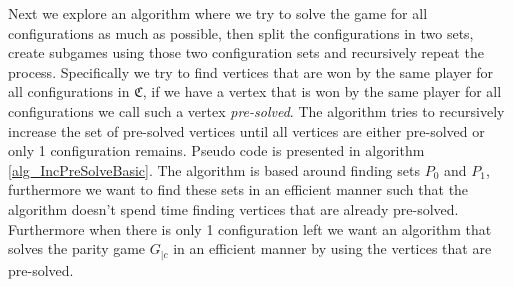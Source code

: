 Next we explore an algorithm where we try to solve the game for all configurations as much as possible, then split the configurations in two sets, create subgames using those two configuration sets and recursively repeat the process. Specifically we try to find vertices that are won by the same player for all configurations in $\mathfrak{C}$, if we have a vertex that is won by the same player for all configurations we call such a vertex \textit{pre-solved}. The algorithm tries to recursively increase the set of pre-solved vertices until all vertices are either pre-solved or only 1 configuration remains. Pseudo code is presented in algorithm \ref{alg_IncPreSolveBasic}. The algorithm is based around finding sets $P_0$ and $P_1$, furthermore we want to find these sets in an efficient manner such that the algorithm doesn't spend time finding vertices that are already pre-solved. Furthermore when there is only 1 configuration left we want an algorithm that solves the parity game $G_{|c}$ in an efficient manner by using the vertices that are pre-solved.

